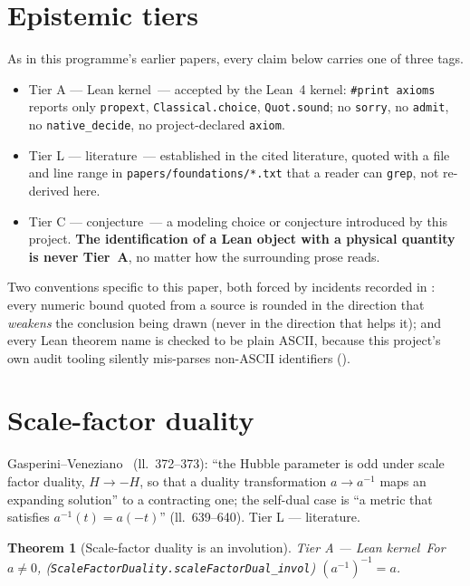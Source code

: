 \documentclass[11pt,a4paper]{article}
\newtheorem{theorem}{Theorem}[section]
\theoremstyle{remark}
\newcommand{\tierA}{\colorbox{green!15}{\textsf{\scriptsize Tier A --- Lean kernel}}}
\newcommand{\tierL}{\colorbox{blue!10}{\textsf{\scriptsize Tier L --- literature}}}
\newcommand{\tierC}{\colorbox{orange!15}{\textsf{\scriptsize Tier C --- conjecture}}}
\begin{document}
\section{Epistemic tiers}
\label{sec:tiers}
As in this programme's earlier papers, every claim below carries one of three tags.
\begin{itemize}
  \item \tierA\ --- accepted by the Lean~4 kernel: \texttt{\#print axioms} reports only
  \texttt{propext}, \texttt{Classical.choice}, \texttt{Quot.sound}; no \texttt{sorry}, no
  \texttt{admit}, no \texttt{native\_decide}, no project-declared \texttt{axiom}.
  \item \tierL\ --- established in the cited literature, quoted with a file and line range in
  \texttt{papers/foundations/*.txt} that a reader can \texttt{grep}, not re-derived here.
  \item \tierC\ --- a modeling choice or conjecture introduced by this project. \textbf{The
  identification of a Lean object with a physical quantity is never Tier~A}, no matter how the
  surrounding prose reads.
\end{itemize}
Two conventions specific to this paper, both forced by incidents recorded in
: every numeric bound quoted from a source is rounded in the direction that
\emph{weakens} the conclusion being drawn (never in the direction that helps it); and every
Lean theorem name is checked to be plain ASCII, because this project's own audit tooling silently
mis-parses non-ASCII identifiers ().

\section{Scale-factor duality}
\label{sec:duality}
Gasperini--Veneziano~\cite{GasperiniVeneziano1993} (ll.~372--373): ``the Hubble parameter is odd
under scale factor duality, $H\to-H$, so that a duality transformation $a\to a^{-1}$ maps an
expanding solution'' to a contracting one; the self-dual case is ``a metric that satisfies
$a^{-1}(t)=a(-t)$'' (ll.~639--640). \tierL.

\begin{theorem}[Scale-factor duality is an involution] \label{thm:invol} \tierA\
For $a\ne0$, \textnormal{(}\texttt{ScaleFactorDuality.scaleFactorDual\_invol}\textnormal{)}
$(a^{-1})^{-1}=a$.
\end{theorem}
\end{document}
